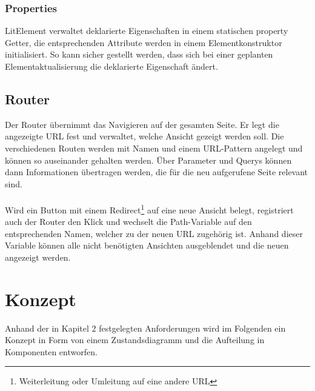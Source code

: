 \documentclass[12pt,					%
							 oneside,			%
							 a4paper,			%
							 halfparskip,		%
							 liststotoc,			%
							 bibtotoc,			%
							 fleqn,				%
							 pointlessnumbers]	%
							 {scrreprt}
\begin{document}
					\subsection{Properties}
					LitElement verwaltet deklarierte Eigenschaften in einem statischen property Getter, die entsprechenden Attribute werden in einem Elementkonstruktor initialisiert. So kann sicher gestellt werden, dass sich bei einer geplanten Elementaktualisierung die deklarierte Eigenschaft ändert.  \cite{litelem}
		
		\section{Router}
		Der Router übernimmt das Navigieren auf der gesamten Seite. Er legt die angezeigte URL fest und verwaltet, welche Ansicht gezeigt werden soll. Die verschiedenen Routen werden mit Namen und einem URL-Pattern angelegt und können so auseinander gehalten werden. Über Parameter und Querys können dann Informationen übertragen werden, die für die neu aufgerufene Seite relevant sind.\\
\\
Wird ein Button mit einem Redirect\footnote{\label{foot:1}Weiterleitung oder Umleitung auf eine andere URL} auf eine neue Ansicht belegt, registriert auch der Router den Klick und wechselt die Path-Variable auf den entsprechenden Namen, welcher zu der neuen URL zugehörig ist. Anhand dieser Variable können alle nicht benötigten Ansichten ausgeblendet und die neuen angezeigt werden.				

\chapter{Konzept}	
Anhand der in Kapitel 2 festgelegten Anforderungen	wird im Folgenden ein Konzept in Form von einem Zustandsdiagramm und die Aufteilung in Komponenten entworfen.

		
\end{document}

